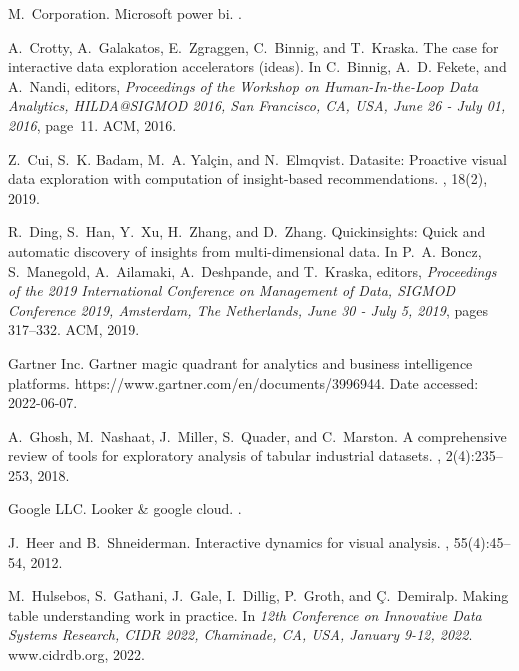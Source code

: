 \documentclass[11pt]{article}
\begin{document}
\begin{thebibliography}{10}
\begin{small}
M.~Corporation.
\newblock Microsoft power bi.
.

A.~Crotty, A.~Galakatos, E.~Zgraggen, C.~Binnig, and T.~Kraska.
\newblock The case for interactive data exploration accelerators (ideas).
\newblock In C.~Binnig, A.~D. Fekete, and A.~Nandi, editors, {\em Proceedings
  of the Workshop on Human-In-the-Loop Data Analytics, HILDA@SIGMOD 2016, San
  Francisco, CA, USA, June 26 - July 01, 2016}, page~11. {ACM}, 2016.

Z.~Cui, S.~K. Badam, M.~A. Yal{\c{c}}in, and N.~Elmqvist.
\newblock Datasite: Proactive visual data exploration with computation of
  insight-based recommendations.
, 18(2), 2019.

R.~Ding, S.~Han, Y.~Xu, H.~Zhang, and D.~Zhang.
\newblock Quickinsights: Quick and automatic discovery of insights from
  multi-dimensional data.
\newblock In P.~A. Boncz, S.~Manegold, A.~Ailamaki, A.~Deshpande, and
  T.~Kraska, editors, {\em Proceedings of the 2019 International Conference on
  Management of Data, {SIGMOD} Conference 2019, Amsterdam, The Netherlands,
  June 30 - July 5, 2019}, pages 317--332. {ACM}, 2019.

{\relax Gartner Inc.}
\newblock Gartner magic quadrant for analytics and business intelligence
  platforms.
\newblock https://www.gartner.com/en/documents/3996944. Date accessed:
  2022-06-07.

A.~Ghosh, M.~Nashaat, J.~Miller, S.~Quader, and C.~Marston.
\newblock A comprehensive review of tools for exploratory analysis of tabular
  industrial datasets.
, 2(4):235--253, 2018.

{Google LLC}.
\newblock Looker \& google cloud.
.

J.~Heer and B.~Shneiderman.
\newblock Interactive dynamics for visual analysis.
, 55(4):45--54, 2012.

M.~Hulsebos, S.~Gathani, J.~Gale, I.~Dillig, P.~Groth, and {\c{C}}.~Demiralp.
\newblock Making table understanding work in practice.
\newblock In {\em 12th Conference on Innovative Data Systems Research, {CIDR}
  2022, Chaminade, CA, USA, January 9-12, 2022}. www.cidrdb.org, 2022.


\end{small}
\end{thebibliography}
\end{document}
